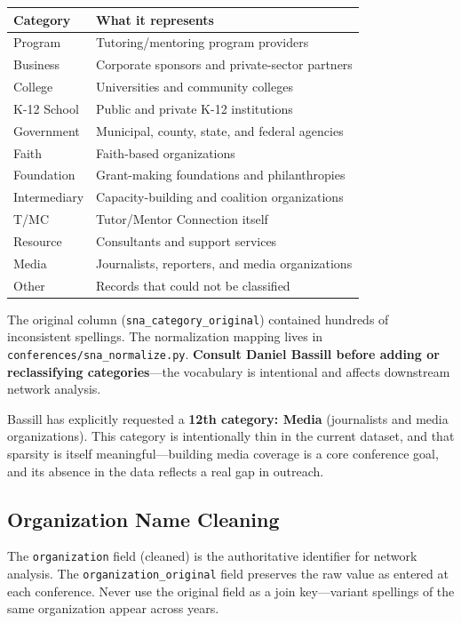 \documentclass[12pt]{article}
\begin{document}
\begin{center}
\begin{tabular}{ll}
\toprule
Category & What it represents \\
\midrule
Program      & Tutoring/mentoring program providers \\
Business     & Corporate sponsors and private-sector partners \\
College      & Universities and community colleges \\
K-12 School  & Public and private K-12 institutions \\
Government   & Municipal, county, state, and federal agencies \\
Faith        & Faith-based organizations \\
Foundation   & Grant-making foundations and philanthropies \\
Intermediary & Capacity-building and coalition organizations \\
T/MC         & Tutor/Mentor Connection itself \\
Resource     & Consultants and support services \\
Media        & Journalists, reporters, and media organizations \\
Other        & Records that could not be classified \\
\bottomrule
\end{tabular}
\end{center}

The original column (\texttt{sna\_category\_original}) contained hundreds of
inconsistent spellings. The normalization mapping lives in
\texttt{conferences/sna\_normalize.py}. \textbf{Consult Daniel Bassill
before adding or reclassifying categories}---the vocabulary is intentional
and affects downstream network analysis.

Bassill has explicitly requested a \textbf{12th category: Media}
(journalists and media organizations). This category is intentionally thin
in the current dataset, and that sparsity is itself meaningful---building
media coverage is a core conference goal, and its absence in the data
reflects a real gap in outreach.

\subsection{Organization Name Cleaning}

The \texttt{organization} field (cleaned) is the authoritative identifier for
network analysis. The \texttt{organization\_original} field preserves the raw
value as entered at each conference. Never use the original field as a join
key---variant spellings of the same organization appear across years.
\end{document}
